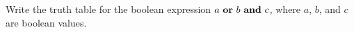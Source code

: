 Write the truth table for the boolean expression $a \text{ \texttt{\bf or} } b \text{ \texttt{\bf and} } c$, where $a$, $b$, and $c$ are boolean values.